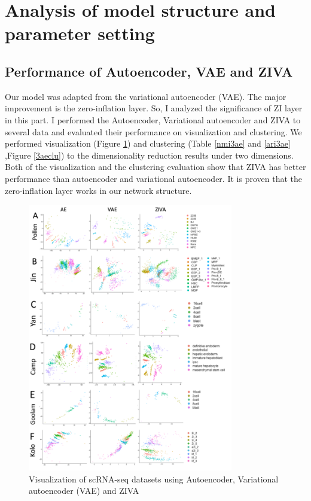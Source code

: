 \section{Analysis of model structure and parameter setting}
\subsection{Performance of Autoencoder, VAE and ZIVA}
Our model was adapted from the variational autoencoder (VAE). The major improvement is the zero-inflation layer. So, I analyzed the significance of ZI layer in this part. I performed the Autoencoder, Variational autoencoder and ZIVA to several data and evaluated their performance on visualization and clustering. We performed visualization (Figure \ref{3ae}) and clustering (Table \ref{nmi3ae} and \ref{ari3ae} ,Figure \ref{3aeclu}) to the dimensionality reduction results under two dimensions. Both of the visualization and the clustering evaluation show that ZIVA has better performance than autoencoder and variational autoencoder. It is proven that the zero-inflation layer works in our network structure. \\
\begin{figure}[htb!]
    \centering
    \includegraphics[width=0.8\textwidth]{figures/myfigures/3ae.png}
    \caption{Visualization of scRNA-seq datasets using Autoencoder, Variational autoencoder (VAE) and ZIVA}
    \label{3ae}
\end{figure}
